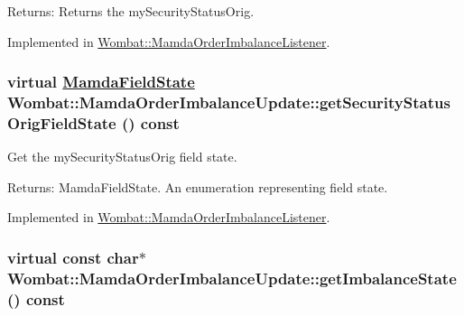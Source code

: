 \begin{Desc}
\item[Returns:]Returns the my\-Security\-Status\-Orig. \end{Desc}


Implemented in \hyperlink{classWombat_1_1MamdaOrderImbalanceListener_ea12f359de6aa79408f26d36ea8db179}{Wombat::Mamda\-Order\-Imbalance\-Listener}.\hypertarget{classWombat_1_1MamdaOrderImbalanceUpdate_ce9f85429dfd33b084286bffbe768d9d}{
\subsubsection[getSecurityStatusOrigFieldState]{\setlength{\rightskip}{0pt plus 5cm}virtual \hyperlink{namespaceWombat_93aac974f2ab713554fd12a1fa3b7d2a}{Mamda\-Field\-State} Wombat::Mamda\-Order\-Imbalance\-Update::get\-Security\-Status\-Orig\-Field\-State () const}}
\label{classWombat_1_1MamdaOrderImbalanceUpdate_ce9f85429dfd33b084286bffbe768d9d}


Get the my\-Security\-Status\-Orig field state. 

\begin{Desc}
\item[Returns:]Mamda\-Field\-State. An enumeration representing field state. \end{Desc}


Implemented in \hyperlink{classWombat_1_1MamdaOrderImbalanceListener_1748b68453c66e890d34f666d6525832}{Wombat::Mamda\-Order\-Imbalance\-Listener}.\hypertarget{classWombat_1_1MamdaOrderImbalanceUpdate_4ed34f737d4f4b0d9af5b683ad87f5e6}{
\subsubsection[getImbalanceState]{\setlength{\rightskip}{0pt plus 5cm}virtual const char$\ast$ Wombat::Mamda\-Order\-Imbalance\-Update::get\-Imbalance\-State () const}}
\label{classWombat_1_1MamdaOrderImbalanceUpdate_4ed34f737d4f4b0d9af5b683ad87f5e6}


